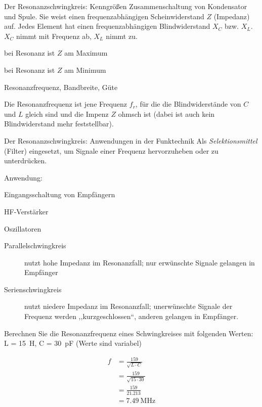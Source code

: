 \documentclass[avery5371,grid,frame,a4paper]{flashcards}
\newcommand{\card}[3]{
  \begin{flashcard}[{\chap} -- #1]{#2}#3\end{flashcard}
}
\begin{document}
\card{18}{Der Resonanzschwingkreis: Kenngrößen}{
  \footnotesize
  Zusammenschaltung von Kondensator und Spule. Sie weist einen frequenzabhängigen Scheinwiderstand $Z$ (Impedanz) auf. Jedes Element hat einen frequenzabhängigen Blindwiderstand $X_C$ bzw. $X_L$. $X_C$ nimmt mit Frequenz ab, $X_L$ nimmt zu.

  \begin{description}\itemsep0pt
    \item[Parallelschwingkreis] bei Resonanz ist $Z$ am Maximum
    \item[Serienschwingkreis] bei Resonanz ist $Z$ am Minimum
    \item[Kenngrößen] Resonanzfrequenz, Bandbreite, Güte
  \end{description}

  Die Resonanzfrequenz ist jene Frequenz $f_r$, für die die Blindwiderstände von $C$ und $L$ gleich sind und die Impenz $Z$ ohmsch ist (dabei ist auch kein Blindwiderstand mehr feststellbar).
}
\card{19}{Der Resonanzschwingkreis: Anwendungen in der Funktechnik}{
  \small
  Als \emph{Selektionsmittel} (Filter) eingesetzt, um Signale einer Frequenz hervorzuheben oder zu unterdrücken.

  Anwendung:
  \begin{itemize*}\itemsep0pt
    \item Eingangsschaltung von Empfängern
    \item HF-Verstärker
    \item Oszillatoren
  \end{itemize*}

  \begin{description}
    \item[Parallelschwingkreis] nutzt hohe Impedanz im Resonanzfall; nur erwünschte Signale gelangen in Empfänger
    \item[Serienschwingkreis] nutzt niedere Impedanz im Resonanzfall; unerwünschte Signale der Frequenz werden ,,kurzgeschlossen``, anderen gelangen in Empfänger.
  \end{description}
}
\card{20}{Berechnen Sie die Resonanzfrequenz eines Schwingkreises mit folgenden Werten: L = \SI{15}{\henry}, C = \SI{30}{\pico\farad} (Werte sind variabel)}{

  {\begin{align*}
    f &= \frac{159}{\sqrt{L\cdot C}} \\
      &= \frac{159}{\sqrt{15 \cdot 30}} \\
      &= \frac{159}{21.213} \\
      &= \SI{7.49}{\mega\Hz} \\
  \end{align*}}
}
\end{document}
